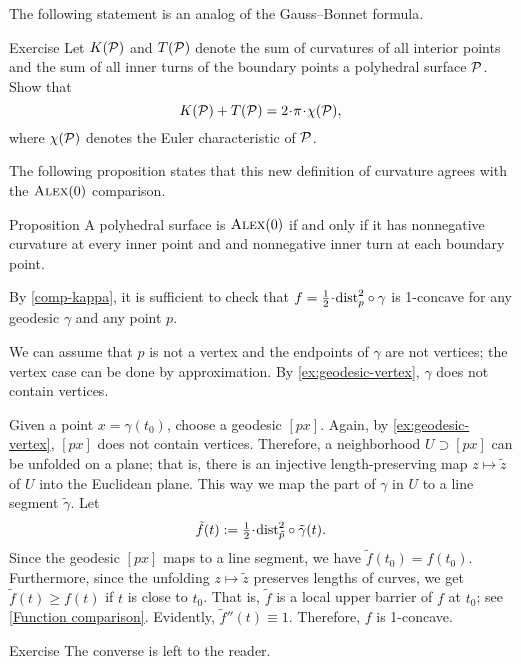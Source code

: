 The following statement is an analog of the Gauss--Bonnet formula.

\begin{thm}{Exercise}\label{ex:gauss-bonnet}
Let $K(\mathcal{P})$ and $T(\mathcal{P})$ denote the sum of curvatures of all interior points
and the sum of all inner turns of the boundary points a polyhedral surface $\mathcal{P}$.
Show that
\[K(\spc{P})+T(\spc{P})=2\cdot\pi\cdot\chi(\spc{P}),\]
where $\chi(\mathcal{P})$ denotes the Euler characteristic of $\mathcal{P}$.
\end{thm}

The following proposition states that this new definition of curvature agrees with the $\textsc{Alex}(0)$ comparison.

\begin{thm}{Proposition}\label{prop:poly-CBB}
A polyhedral surface is $\textsc{Alex}(0)$ if and only if it has nonnegative curvature at every inner point and and nonnegative inner turn at each boundary point.
\end{thm}

By \ref{comp-kappa}, it is sufficient to check that
$f=\tfrac12\cdot\distfun_p^2\circ\gamma$ is 1-concave for any geodesic $\gamma$ and any point $p$.

We can assume that $p$ is not a vertex and the endpoints of $\gamma$ are not vertices;
the vertex case can be done by approximation.
By \ref{ex:geodesic-vertex}, $\gamma$ does not contain vertices.

Given a point $x=\gamma(t_0)$, choose a geodesic $[px]$.
Again, by \ref{ex:geodesic-vertex}, $[px]$ does not contain vertices.
Therefore, a neighborhood $U\supset [px]$ can be unfolded on a plane;
that is, there is an injective length-preserving map $z\mapsto \tilde z$
of $U$ into the Euclidean plane.
This way we map the part of $\gamma$ in $U$ to a line segment $\tilde\gamma$.
Let
\[\tilde f(t)\df\tfrac12\cdot\distfun_{\tilde p}^2\circ\tilde \gamma(t).\]
Since the geodesic $[px]$ maps to a line segment, we have $\tilde f(t_0)= f(t_0)$.
Furthermore, since the unfolding $z\mapsto \tilde z$ preserves lengths of curves, we get
$\tilde f(t)\ge f(t)$ if $t$ is close to $t_0$.
That is, $\tilde f$ is a local upper barrier of $f$ at $t_0$; see \ref{Function comparison}.
Evidently, $\tilde f''(t)\equiv 1$.
Therefore, $f$ is 1-concave.

\begin{thm}{Exercise}\label{ex:poly-CBB}
The converse is left to the reader.\qeds
\end{thm}

